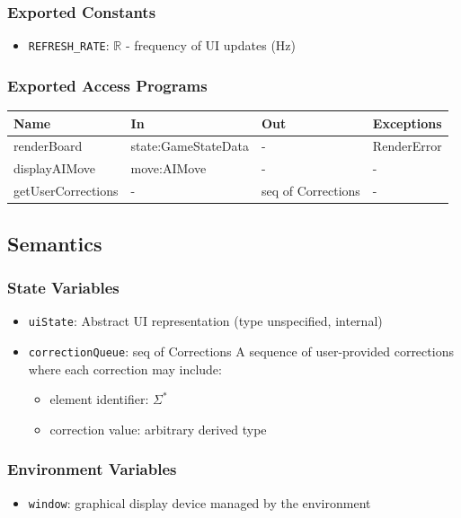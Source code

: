 \documentclass[12pt, titlepage]{article}
\begin{document}
\subsubsection{Exported Constants}
\begin{itemize}
\item \texttt{REFRESH\_RATE}: $\mathbb{R}$ - frequency of UI updates (Hz)
\end{itemize}

\subsubsection{Exported Access Programs}
\begin{center}
\begin{tabular}{p{5cm} p{4cm} p{4cm} p{3cm}}
\hline
\textbf{Name} & \textbf{In} & \textbf{Out} & \textbf{Exceptions} \\
\hline
renderBoard & state:GameStateData & - & RenderError \\
displayAIMove & move:AIMove & - & - \\
getUserCorrections & - & seq of Corrections & - \\
\hline
\end{tabular}
\end{center}

\subsection{Semantics}

\subsubsection{State Variables}
\begin{itemize}
\item \texttt{uiState}: Abstract UI representation (type unspecified, internal)
\item \texttt{correctionQueue}: seq of Corrections
      \quad A sequence of user-provided corrections where each correction may include:
      \begin{itemize}
          \item element identifier: $\Sigma^{*}$
          \item correction value: arbitrary derived type
      \end{itemize}
\end{itemize}

\subsubsection{Environment Variables}
\begin{itemize}
\item \texttt{window}: graphical display device managed by the environment
\end{itemize}
\end{document}
